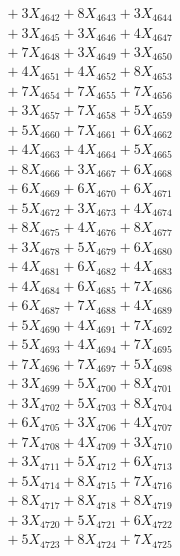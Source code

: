 \documentclass[a4paper,10pt]{article}
\begin{document}
{\begin{align}
&\;  + 3 X_{4642} + 8 X_{4643} + 3 X_{4644} \\[0.3ex]
&\;  + 3 X_{4645} + 3 X_{4646} + 4 X_{4647} \\[0.3ex]
&\;  + 7 X_{4648} + 3 X_{4649} + 3 X_{4650} \\[0.3ex]
&\;  + 4 X_{4651} + 4 X_{4652} + 8 X_{4653} \\[0.3ex]
&\;  + 7 X_{4654} + 7 X_{4655} + 7 X_{4656} \\[0.3ex]
&\;  + 3 X_{4657} + 7 X_{4658} + 5 X_{4659} \\[0.5ex]\allowbreak
&\;  + 5 X_{4660} + 7 X_{4661} + 6 X_{4662} \\[0.3ex]
&\;  + 4 X_{4663} + 4 X_{4664} + 5 X_{4665} \\[0.3ex]
&\;  + 8 X_{4666} + 3 X_{4667} + 6 X_{4668} \\[0.3ex]
&\;  + 6 X_{4669} + 6 X_{4670} + 6 X_{4671} \\[0.3ex]
&\;  + 5 X_{4672} + 3 X_{4673} + 4 X_{4674} \\[0.3ex]
&\;  + 8 X_{4675} + 4 X_{4676} + 8 X_{4677} \\[0.3ex]
&\;  + 3 X_{4678} + 5 X_{4679} + 6 X_{4680} \\[0.3ex]
&\;  + 4 X_{4681} + 6 X_{4682} + 4 X_{4683} \\[0.3ex]
&\;  + 4 X_{4684} + 6 X_{4685} + 7 X_{4686} \\[0.3ex]
&\;  + 6 X_{4687} + 7 X_{4688} + 4 X_{4689} \\[0.5ex]\allowbreak
&\;  + 5 X_{4690} + 4 X_{4691} + 7 X_{4692} \\[0.3ex]
&\;  + 5 X_{4693} + 4 X_{4694} + 7 X_{4695} \\[0.3ex]
&\;  + 7 X_{4696} + 7 X_{4697} + 5 X_{4698} \\[0.3ex]
&\;  + 3 X_{4699} + 5 X_{4700} + 8 X_{4701} \\[0.3ex]
&\;  + 3 X_{4702} + 5 X_{4703} + 8 X_{4704} \\[0.3ex]
&\;  + 6 X_{4705} + 3 X_{4706} + 4 X_{4707} \\[0.3ex]
&\;  + 7 X_{4708} + 4 X_{4709} + 3 X_{4710} \\[0.3ex]
&\;  + 3 X_{4711} + 5 X_{4712} + 6 X_{4713} \\[0.3ex]
&\;  + 5 X_{4714} + 8 X_{4715} + 7 X_{4716} \\[0.3ex]
&\;  + 8 X_{4717} + 8 X_{4718} + 8 X_{4719} \\[0.5ex]\allowbreak
&\;  + 3 X_{4720} + 5 X_{4721} + 6 X_{4722} \\[0.3ex]
&\;  + 5 X_{4723} + 8 X_{4724} + 7 X_{4725} \\[0.3ex]

\end{align}}
\end{document}
